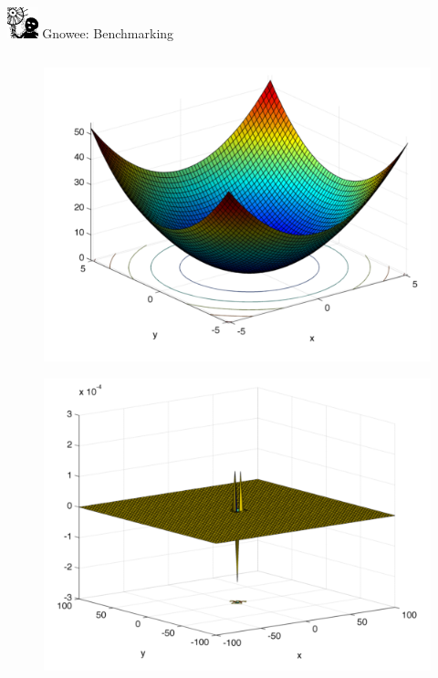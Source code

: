 \documentclass[xcolor=x11names,compress,handout]{beamer}
\renewcommand{\(}{\begin{columns}}
\renewcommand{\)}{\end{columns}}
\newcommand{\<}[1]{\begin{column}{#1}}
\renewcommand{\>}{\end{column}}
\begin{document}
\begin{frame}{\includegraphics[width=0.35in]{../figs/Gnowee.png} Gnowee: Benchmarking \cite{Walton2013a,Yang2014,Civicioglu2013}}
\begin{columns}
    \begin{column}{0.33\linewidth}
      \vspace{-.55cm} 
      \begin{figure}[htp]
        \centering
        \includegraphics[width=1.0\textwidth, height=0.25\textheight]{../figs/DeJong.png} 
        \vspace{-0.35cm}
      \end{figure}        
      \vspace{-1.05cm} 
      \begin{figure}[htp]
        \centering
        \includegraphics[width=1.0\textwidth, height=0.25\textheight]{../figs/Easom.png} 

\end{figure}
\end{column}
\end{columns}
\end{frame}
\end{document}
